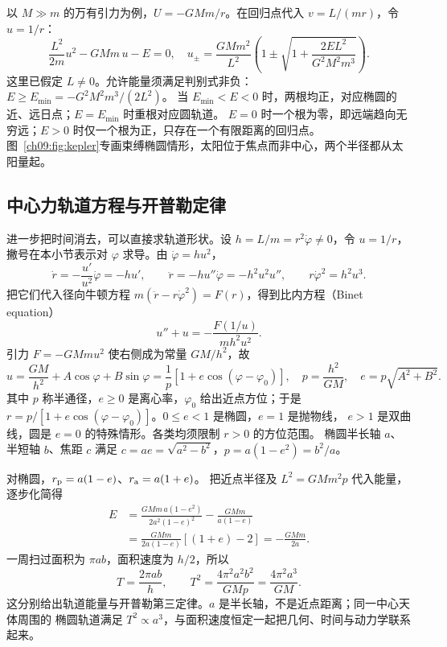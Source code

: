 以 $M\gg m$ 的万有引力为例，$U=-GMm/r$。在回归点代入 $v=L/(mr)$，令 $u=1/r$：
\begin{equation}
 \frac{L^2}{2m}u^2-GMm\,u-E=0,
 \quad
 u_\pm=\frac{GMm^2}{L^2}
 \left(1\pm\sqrt{1+\frac{2EL^2}{G^2M^2m^3}}\right).
\end{equation}
这里已假定 $L\ne0$。允许能量须满足判别式非负：
$E\ge E_{\min}=-G^2M^2m^3/(2L^2)$。
当 $E_{\min}<E<0$ 时，两根均正，对应椭圆的近、远日点；$E=E_{\min}$ 时重根对应圆轨道。
$E=0$ 时一个根为零，即远端趋向无穷远；$E>0$ 时仅一个根为正，只存在一个有限距离的回归点。
图~\ref{ch09:fig:kepler}专画束缚椭圆情形，太阳位于焦点而非中心，两个半径都从太阳量起。
\keplerContextDiagram

\subsection{中心力轨道方程与开普勒定律}
进一步把时间消去，可以直接求轨道形状。设 $h=L/m=r^2\dot\varphi\ne0$，令 $u=1/r$，
撇号在本小节表示对 $\varphi$ 求导。由 $\dot\varphi=hu^2$，
\begin{equation}
 \dot r=-\frac{u'}{u^2}\dot\varphi=-hu',\qquad
 \ddot r=-h u''\dot\varphi=-h^2u^2u'',\qquad
 r\dot\varphi^2=h^2u^3.
\end{equation}
把它们代入径向牛顿方程 $m(\ddot r-r\dot\varphi^2)=F(r)$，得到比内方程（Binet equation）
\begin{equation}
 u''+u=-\frac{F(1/u)}{mh^2u^2}.
\end{equation}
引力 $F=-GMmu^2$ 使右侧成为常量 $GM/h^2$，故
\begin{equation}
 u=\frac{GM}{h^2}+A\cos\varphi+B\sin\varphi
 =\frac1p[1+e\cos(\varphi-\varphi_0)],
 \quad p=\frac{h^2}{GM},\quad e=p\sqrt{A^2+B^2}.
\end{equation}
其中 $p$ 称半通径，$e\ge0$ 是离心率，$\varphi_0$ 给出近点方位；于是
$r=p/[1+e\cos(\varphi-\varphi_0)]$。$0\le e<1$ 是椭圆，$e=1$ 是抛物线，
$e>1$ 是双曲线，圆是 $e=0$ 的特殊情形。各类均须限制 $r>0$ 的方位范围。
椭圆半长轴 $a$、半短轴 $b$、焦距 $c$ 满足
$c=ae=\sqrt{a^2-b^2}$，$p=a(1-e^2)=b^2/a$。

对椭圆，$r_{\rm p}=a(1-e)$、$r_{\rm a}=a(1+e)$。
把近点半径及 $L^2=GMm^2p$ 代入能量，逐步化简得
\begin{align}
 E&=\frac{GMm\,a(1-e^2)}{2a^2(1-e)^2}-\frac{GMm}{a(1-e)}\\
 &=\frac{GMm}{2a(1-e)}[(1+e)-2]
 =-\frac{GMm}{2a}.
\end{align}
一周扫过面积为 $\pi ab$，面积速度为 $h/2$，所以
\begin{equation}
 T=\frac{2\pi ab}{h},\qquad
 T^2=\frac{4\pi^2a^2b^2}{GMp}=\frac{4\pi^2a^3}{GM}.
\end{equation}
这分别给出轨道能量与开普勒第三定律。$a$ 是半长轴，不是近点距离；同一中心天体周围的
椭圆轨道满足 $T^2\propto a^3$，与面积速度恒定一起把几何、时间与动力学联系起来。

